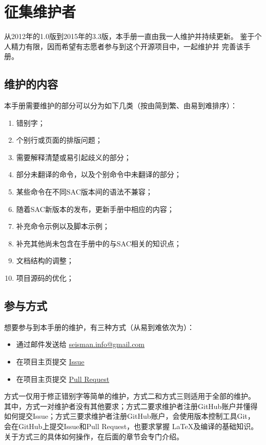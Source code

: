 \section{征集维护者}
从2012年的1.0版到2015年的3.3版，本手册一直由我一人维护并持续更新。
鉴于个人精力有限，因而希望有志愿者参与到这个开源项目中，一起维护并
完善该手册。

\subsection{维护的内容}
本手册需要维护的部分可以分为如下几类（按由简到繁、由易到难排序）：
\begin{enumerate}
\item 错别字；
\item 个别行或页面的排版问题；
\item 需要解释清楚或易引起歧义的部分；
\item 部分未翻译的命令，以及个别命令中未翻译的部分；
\item 某些命令在不同SAC版本间的语法不兼容；
\item 随着SAC新版本的发布，更新手册中相应的内容；
\item 补充命令示例以及脚本示例；
\item 补充其他尚未包含在手册中的与SAC相关的知识点；
\item 文档结构的调整；
\item 项目源码的优化；
\end{enumerate}

\subsection{参与方式}
想要参与到本手册的维护，有三种方式（从易到难依次为）：
\begin{itemize}
\item 通过邮件发送给 \url{seisman.info@gmail.com}
\item 在项目主页提交 \href{https://github.com/seisman/SAC_Docs_zh/issues}{Issue}
\item 在项目主页提交 \href{https://github.com/seisman/SAC_Docs_zh/pulls}{Pull Request}
\end{itemize}
方式一仅用于修正错别字等简单的维护，方式二和方式三则适用于全部的维护。
其中，方式一对维护者没有其他要求；方式二要求维护者注册GitHub账户并懂得
如何提交Issue；方式三要求维护者注册GitHub账户，会使用版本控制工具Git，
会在GitHub上提交Issue和Pull Request，也要求掌握 \LaTeX 及编译的基础知识。
关于方式三的具体如何操作，在后面的章节会专门介绍。

